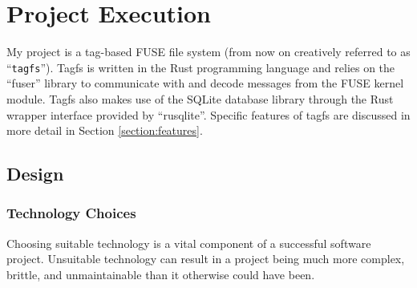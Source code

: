 \chapter{Project Execution}
\vspace{1cm}

My project is a tag-based FUSE file system (from now on creatively referred to
as ``\texttt{tagfs}''). Tagfs is written in the Rust programming language and
relies on the ``fuser'' library to communicate with and decode messages from
the FUSE kernel module. Tagfs also makes use of the SQLite database library
through the Rust wrapper interface provided by ``rusqlite''. Specific features
of tagfs are discussed in more detail in Section \ref{section:features}.

\section{Design}


\subsection{Technology Choices}

Choosing suitable technology is a vital component of a successful software
project. Unsuitable technology can result in a project being much more complex,
brittle, and unmaintainable than it otherwise could have been. 

